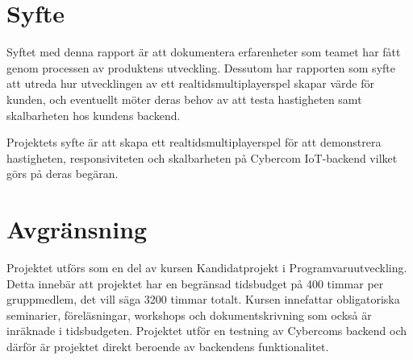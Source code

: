 \section{Syfte}
\label{sec:aim}
Syftet med denna rapport är att dokumentera erfarenheter som teamet har fått genom processen av produktens utveckling. Dessutom har rapporten som syfte att utreda hur utvecklingen av ett realtidsmultiplayerspel skapar värde för kunden, och eventuellt möter deras behov av att testa hastigheten samt skalbarheten hos kundens backend.


Projektets syfte är att skapa ett realtidsmultiplayerspel för att demonstrera hastigheten, responsiviteten och skalbarheten på Cybercom IoT-backend vilket görs på deras begäran.
\section{Avgränsning}
\label{sec:delimitations}

Projektet utförs som en del av kursen Kandidatprojekt i Programvaruutveckling. Detta innebär att projektet har en begränsad tidsbudget på 400 timmar per gruppmedlem, det vill säga 3200 timmar totalt. Kursen innefattar obligatoriska seminarier, föreläsningar, workshops och dokumentskrivning som också är inräknade i tidsbudgeten. Projektet utför en testning av Cybercoms backend och därför är projektet direkt beroende av backendens funktionalitet.
